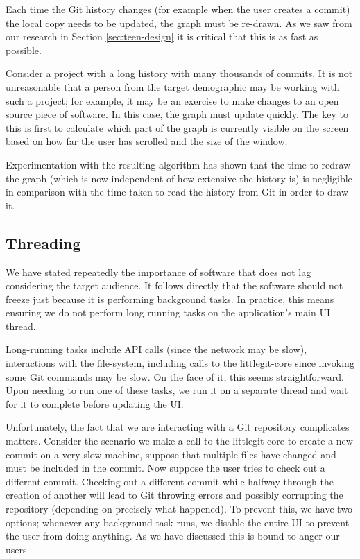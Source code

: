 
Each time the Git history changes (for example when the user creates a commit) the local copy needs to be updated, the graph must be re-drawn. As we saw from our research in Section \ref{sec:teen-design} it is critical that this is as fast as possible. 

Consider a project with a long history with many thousands of commits. It is not unreasonable that a person from the target demographic may be working with such a project; for example, it may be an exercise to make changes to an open source piece of software. In this case, the graph must update quickly. The key to this is first to calculate which part of the graph is currently visible on the screen based on how far the user has scrolled and the size of the window.

Experimentation with the resulting algorithm has shown that the time to redraw the graph (which is now independent of how extensive the history is) is negligible in comparison with the time taken to read the history from Git in order to draw it.

\subsection{Threading}

We have stated repeatedly the importance of software that does not lag considering the target audience. It follows directly that the software should not freeze just because it is performing background tasks. In practice, this means ensuring we do not perform long running tasks on the application's main UI thread.

Long-running tasks include API calls (since the network may be slow), interactions with the file-system, including calls to the littlegit-core since invoking some Git commands may be slow. On the face of it, this seems straightforward. Upon needing to run one of these tasks, we run it on a separate thread and wait for it to complete before updating the UI.

Unfortunately, the fact that we are interacting with a Git repository complicates matters. Consider the scenario we make a call to the littlegit-core to create a new commit on a very slow machine, suppose that multiple files have changed and must be included in the commit. Now suppose the user tries to check out a different commit. Checking out a different commit while halfway through the creation of another will lead to Git throwing errors and possibly corrupting the repository (depending on precisely what happened). To prevent this, we have two options; whenever any background task runs, we disable the entire UI to prevent the user from doing anything. As we have discussed this is bound to anger our users.

